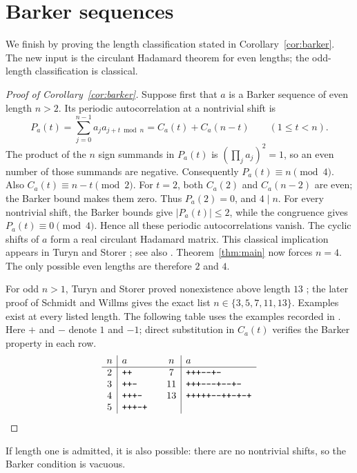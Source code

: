 \section{Barker sequences}\label{sec:barker}

We finish by proving the length classification stated in
Corollary~\ref{cor:barker}. The new input is the circulant Hadamard
theorem for even lengths; the odd-length classification is classical.

\begin{proof}[Proof of Corollary~\ref{cor:barker}]
Suppose first that \(a\) is a Barker sequence of even length \(n>2\).
Its periodic autocorrelation at a nontrivial shift is
\[
 P_a(t)=\sum_{j=0}^{n-1}a_j a_{j+t\bmod n}
       =C_a(t)+C_a(n-t)\qquad(1\leq t<n).
\]
The product of the \(n\) sign summands in \(P_a(t)\) is
\((\prod_j a_j)^2=1\), so an even number of those summands are
negative. Consequently \(P_a(t)\equiv n\pmod4\).
Also \(C_a(t)\equiv n-t\pmod2\). For \(t=2\), both \(C_a(2)\)
and \(C_a(n-2)\) are even; the Barker bound makes them zero.
Thus \(P_a(2)=0\), and \(4\mid n\). For every nontrivial shift,
the Barker bounds give \(|P_a(t)|\leq2\), while the congruence gives
\(P_a(t)\equiv0\pmod4\). Hence all these periodic autocorrelations
vanish. The cyclic shifts of \(a\) form a real circulant Hadamard
matrix. This classical implication appears in Turyn and Storer
\cite[p.~395, footnote~2]{TurynStorer1961}; see also
\cite[p.~330]{Turyn1965}. Theorem~\ref{thm:main} now forces \(n=4\).
The only possible even lengths are therefore \(2\) and \(4\).

For odd \(n>1\), Turyn and Storer proved nonexistence above length
\(13\) \cite{TurynStorer1961}; the later proof of Schmidt and Willms
\cite[Theorem~1]{SchmidtWillms2016} gives the exact list
\(n\in\{3,5,7,11,13\}\). Examples exist at every listed length.
The following table uses the examples recorded in
\cite[Section~1]{SchmidtWillms2016}. Here \(+\) and \(-\) denote
\(1\) and \(-1\); direct substitution
in \(C_a(t)\) verifies the Barker property in each row.
\[
\begin{array}[b]{c|l@{\qquad}c|l}
 n & a & n & a\\ \hline
 2 & \texttt{++} & 7 & \texttt{+++{-}{-}+{-}}\\
 3 & \texttt{++-} & 11 & \texttt{+++{-}{-}{-}+{-}{-}+{-}}\\
 4 & \texttt{+++-} & 13 & \texttt{+++++{-}{-}++{-}+{-}+}\\
 5 & \texttt{+++-+} & &
\end{array}\qedhere
\]
\end{proof}

If length one is admitted, it is also possible: there are no nontrivial
shifts, so the Barker condition is vacuous.
